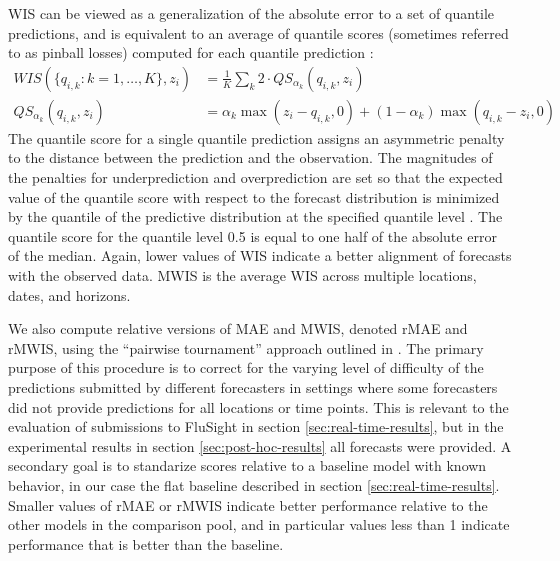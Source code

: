 \documentclass{article}\usepackage[]{graphicx}\usepackage[]{xcolor}
\begin{document}
WIS can be viewed as a generalization of the absolute error to a set of quantile predictions, and is equivalent to an average of quantile scores (sometimes referred to as pinball losses) computed for each quantile prediction \cite{bracher2021WIS}:
\begin{align*}
WIS(\{q_{i,k}: k = 1, \ldots, K\}, z_{i}) &= \frac{1}{K} \sum_k 2 \cdot QS_{\alpha_k}(q_{i,k}, z_{i}) \\
QS_{\alpha_k}(q_{i,k}, z_{i}) &= \alpha_k \max(z_{i} - q_{i,k}, 0) + (1 - \alpha_k) \max(q_{i,k} - z_{i}, 0)
\end{align*}
The quantile score for a single quantile prediction assigns an asymmetric penalty to the distance between the prediction and the observation. The magnitudes of the penalties for underprediction and overprediction are set so that the expected value of the quantile score with respect to the forecast distribution is minimized by the quantile of the predictive distribution at the specified quantile level \cite{Gneiting2011quantilesoptimalpoint}. The quantile score for the quantile level 0.5 is equal to one half of the absolute error of the median. Again, lower values of WIS indicate a better alignment of forecasts with the observed data. MWIS is the average WIS across multiple locations, dates, and horizons.

We also compute relative versions of MAE and MWIS, denoted rMAE and rMWIS, using the ``pairwise tournament'' approach outlined in \cite{cramer2022covidMortalityForecasts}. The primary purpose of this procedure is to correct for the varying level of difficulty of the predictions submitted by different forecasters in settings where some forecasters did not provide predictions for all locations or time points. This is relevant to the evaluation of submissions to FluSight in section \ref{sec:real-time-results}, but in the experimental results in section \ref{sec:post-hoc-results} all forecasts were provided. A secondary goal is to standarize scores relative to a baseline model with known behavior, in our case the flat baseline described in section \ref{sec:real-time-results}. Smaller values of rMAE or rMWIS indicate better performance relative to the other models in the comparison pool, and in particular values less than 1 indicate performance that is better than the baseline.
\end{document}
